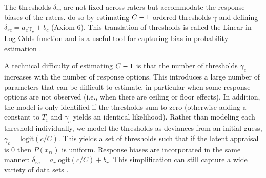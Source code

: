 \documentclass{article}
\newcommand{\Irater}{r}
\newcommand{\Iitem}{i}
\newcommand{\Incat}{c}
\newcommand{\Tncat}{\expandafter\MakeUppercase\expandafter{\Incat}}
\newcommand{\logit}[1]{\text{logit}\left(#1\right)}
\begin{document}
The thresholds $\delta_{\Irater\Incat}$ are not fixed across raters but accommodate the response biases of the raters.  do so by estimating $\Tncat-1$ ordered thresholds $\gamma$ and defining $\delta_{\Irater\Incat} = a_\Incat \gamma_\Incat + b_\Incat$ (Axiom 6). This translation of thresholds is called the Linear in Log Odds function and is a useful tool for capturing bias in probability estimation \cite{Fox1995, Gonzalez1999, Anders2015cultural}.

A technical difficulty of estimating $\Tncat-1$ is that the number of thresholds $\gamma_\Incat$ increases with the number of response options. This introduces a large number of parameters that can be difficult to estimate, in particular when some response options are not observed (i.e., when there are ceiling or floor effects). In addition, the model is only identified if the thresholds sum to zero (otherwise adding a constant to $T_\Iitem$ and $\gamma_\Incat$ yields an identical likelihood). Rather than modeling each threshold individually, we model the thresholds as deviances from an initial guess, $\gamma_\Incat = \logit{c/C}$. This yields a set of thresholds such that if the latent appraisal is 0 then $P(x_{\Irater\Iitem})$ is uniform. Response biases are incorporated in the same manner: $\delta_{\Irater\Incat} = a_\Irater\logit{c/C} + b_\Irater$. This simplification can still capture a wide variety of data sets \cite{Selker2019}.
\end{document}
